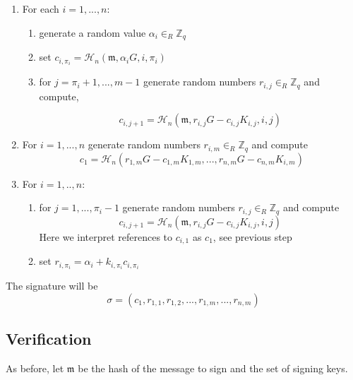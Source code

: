 \begin{enumerate}
	\item For each \(i = 1, ..., n \): \\
	\begin{enumerate}
		\item generate a random value \(\alpha_i \in_R \mathbb{Z}_q\)
		
		\item set \(c_{i, \pi_i} = \mathcal{H}_n(\mathfrak{m}, \alpha_i G, i, \pi_i)\)  
           
		
		\item for \(j = \pi_i + 1, ..., m-1 \) generate random numbers \(r_{i,j} \in_R \mathbb{Z}_q\) and compute,
         
         
		  \[c_{i, j+1} = \mathcal{H}_n(\mathfrak{m}, r_{i,j} G - c_{i, j} K_{i, j}, i, j)\]

	\end{enumerate}
	  
	 \item For \(i  = 1, ..., n \) generate random numbers \(r_{i, m} \in_R \mathbb{Z}_q\) and compute
	  \[c_1 = \mathcal{H}_n ( r_{1, m} G - c_{1,m} K_{1, m}, ..., r_{n, m} G - c_{n, m} K_{i, m}  )\]
	  
	 \item For \(i = 1, .., n \):
	 
	 \begin{enumerate}
	 	\item for \(j = 1, ..., \pi_i-1 \) generate random numbers \(r_{i, j} \in_R \mathbb{Z}_q\) and compute
 	\[c_{i, j+1} = \mathcal{H}_n (\mathfrak{m}, r_{i, j} G - c_{i, j} K_{i, j}, i, j)\]
 	  Here we interpret references to \(c_{i, 1}\) as \(c_1\), see previous step	
 	  
 	  
 	    \item set \(r_{i, \pi_i} = \alpha_i + k_{i, \pi_i} c_{i, \pi_{i}} \)
	 \end{enumerate} 
 
 
\end{enumerate}

The signature will be
 \[\sigma = (c_1, r_{1, 1}, r_{1, 2}, ..., r_{1, m}, ..., r_{n, m} )  \]


\subsection*{Verification}

As before, let \(\mathfrak{m}\) be the hash of the message to sign and the set of signing keys.

